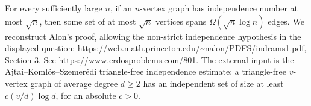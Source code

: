 For every sufficiently large \(n\), if an \(n\)-vertex graph
has independence number at most \(\sqrt n\), then some
set of at most \(\sqrt n\) vertices spans
\(\Omega(\sqrt n\log n)\) edges.
We reconstruct Alon's proof, allowing the non-strict
independence hypothesis in the displayed question:
\url{https://web.math.princeton.edu/~nalon/PDFS/indrams1.pdf},
Section 3. See \url{https://www.erdosproblems.com/801}.
The external input is the Ajtai--Koml\'os--Szemer\'edi
triangle-free independence estimate: a triangle-free
\(v\)-vertex graph of average degree \(d\geq2\) has an
independent set of size at least \(c(v/d)\log d\),
for an absolute \(c>0\).
